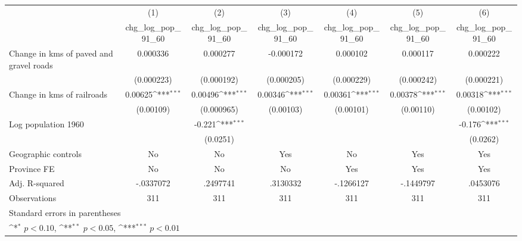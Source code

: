 {
\def\sym#1{\ifmmode^{#1}\else\(^{#1}\)\fi}
\begin{tabular}{l*{6}{c}}
\hline\hline
                    &\multicolumn{1}{c}{(1)}&\multicolumn{1}{c}{(2)}&\multicolumn{1}{c}{(3)}&\multicolumn{1}{c}{(4)}&\multicolumn{1}{c}{(5)}&\multicolumn{1}{c}{(6)}\\
                    &\multicolumn{1}{c}{chg\_log\_pop\_91\_60}&\multicolumn{1}{c}{chg\_log\_pop\_91\_60}&\multicolumn{1}{c}{chg\_log\_pop\_91\_60}&\multicolumn{1}{c}{chg\_log\_pop\_91\_60}&\multicolumn{1}{c}{chg\_log\_pop\_91\_60}&\multicolumn{1}{c}{chg\_log\_pop\_91\_60}\\
\hline
Change in kms of paved and gravel roads&    0.000336         &    0.000277         &   -0.000172         &    0.000102         &    0.000117         &    0.000222         \\
                    &  (0.000223)         &  (0.000192)         &  (0.000205)         &  (0.000229)         &  (0.000242)         &  (0.000221)         \\
[1em]
Change in kms of railroads&     0.00625\sym{***}&     0.00496\sym{***}&     0.00346\sym{***}&     0.00361\sym{***}&     0.00378\sym{***}&     0.00318\sym{***}\\
                    &   (0.00109)         &  (0.000965)         &   (0.00103)         &   (0.00101)         &   (0.00110)         &   (0.00102)         \\
[1em]
Log population 1960 &                     &      -0.221\sym{***}&                     &                     &                     &      -0.176\sym{***}\\
                    &                     &    (0.0251)         &                     &                     &                     &    (0.0262)         \\
\hline
Geographic controls &          No         &          No         &         Yes         &          No         &         Yes         &         Yes         \\
Province FE         &          No         &          No         &          No         &         Yes         &         Yes         &         Yes         \\
Adj. R-squared      &   -.0337072         &    .2497741         &    .3130332         &   -.1266127         &   -.1449797         &    .0453076         \\
Observations        &         311         &         311         &         311         &         311         &         311         &         311         \\
\hline\hline
\multicolumn{7}{l}{\footnotesize Standard errors in parentheses}\\
\multicolumn{7}{l}{\footnotesize \sym{*} \(p<0.10\), \sym{**} \(p<0.05\), \sym{***} \(p<0.01\)}\\
\end{tabular}
}
